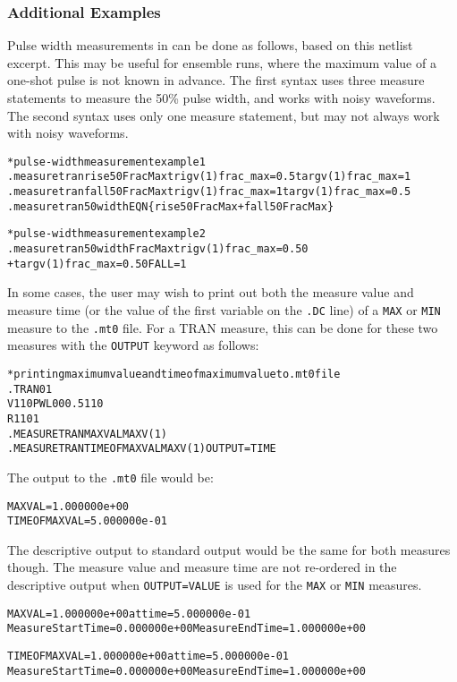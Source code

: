 \subsubsection{Additional Examples}
\label{Measure_Additional_Examples}
Pulse width measurements in \Xyce{} can be done as follows, based on
this netlist excerpt.  This may be useful for ensemble runs, where the
maximum value of a one-shot pulse is not known in advance.  The first
syntax uses three measure statements to measure the 50\% pulse width,
and works with noisy waveforms.  The second syntax uses only one
measure statement, but may not always work with noisy waveforms.

\begin{alltt}
* pulse-width measurement example 1
.measure tran rise50FracMax trig v(1) frac_max=0.5 targ v(1) frac_max=1
.measure tran fall50FracMax trig v(1) frac_max=1 targ v(1) frac_max=0.5
.measure tran 50width EQN\{rise50FracMax + fall50FracMax\}

* pulse-width measurement example 2
.measure tran 50widthFracMax trig v(1) frac_max=0.50
+ targ v(1) frac_max=0.50 FALL=1
\end{alltt}

In some cases, the user may wish to print out both the measure value
and measure time (or the value of the first variable on the {\tt .DC}
line) of a
\texttt{MAX} or \texttt{MIN} measure to the \texttt{.mt0} file.  For a TRAN measure,
this can be done for these two measures with the \texttt{OUTPUT}
keyword as follows:
\begin{alltt}
* printing maximum value and time of maximum value to .mt0 file
.TRAN 0 1
V1 1 0 PWL 0 0 0.5 1 1 0
R1 1 0 1
.MEASURE TRAN MAXVAL MAX V(1)
.MEASURE TRAN TIMEOFMAXVAL MAX V(1) OUTPUT=TIME
\end{alltt}
The output to the \texttt{.mt0} file would be:
\begin{alltt}
MAXVAL = 1.000000e+00
TIMEOFMAXVAL = 5.000000e-01
\end{alltt}
The descriptive output to standard output would be the same for both
measures though.  The measure value and measure time are not
re-ordered in the descriptive output when \texttt{OUTPUT=VALUE} is
used for the \texttt{MAX} or
\texttt{MIN} measures.
\begin{alltt}
MAXVAL = 1.000000e+00 at time = 5.000000e-01
Measure Start Time= 0.000000e+00        Measure End Time= 1.000000e+00

TIMEOFMAXVAL = 1.000000e+00 at time = 5.000000e-01
Measure Start Time= 0.000000e+00        Measure End Time= 1.000000e+00
\end{alltt}

